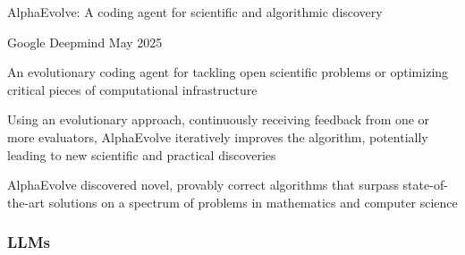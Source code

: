 \begin{frame}
    
    AlphaEvolve: A coding agent for scientific and algorithmic discovery

    Google Deepmind May 2025

    An evolutionary coding agent for tackling open scientific problems or
    optimizing critical pieces of computational infrastructure

    Using an evolutionary approach, continuously receiving feedback from one or
    more evaluators, AlphaEvolve iteratively improves the algorithm,
    potentially leading to new scientific and practical discoveries

    AlphaEvolve discovered novel, provably correct algorithms that surpass
    state-of-the-art solutions on a spectrum of problems in mathematics and
    computer science

\end{frame}

\begin{frame}
    \frametitle{LLMs}
    
    \begin{figure}
       \centering
    \end{figure}

\end{frame}

